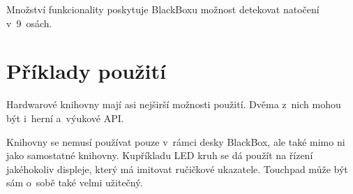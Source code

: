 Množství funkcionality poskytuje BlackBoxu možnost detekovat natočení v~9~osách. %

\section{Příklady použití}

Hardwarové knihovny mají asi nejširší možnosti použití.
Dvěma z~nich mohou být i~herní a~výukové API.

Knihovny se nemusí používat pouze v~rámci desky BlackBox, ale také mimo ni jako samostatné knihovny.
Kupříkladu LED kruh se dá použít na řízení jakéhokoliv displeje, který má imitovat ručičkové ukazatele.
Touchpad může být sám o~sobě také velmi užitečný.
